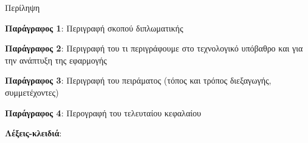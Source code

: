 \pagestyle{plain}
\begin{center}
{\LARGE Περίληψη}\\[1cm]
\end{center}

\setlength{\parindent}{0pt}
\textbf{Παράγραφος 1}: Περιγραφή σκοπού διπλωματικής

\textbf{Παράγραφος 2}: Περιγραφή του τι περιγράφουμε στο τεχνολογικό υπόβαθρο και για
την ανάπτυξη της εφαρμογής

\textbf{Παράγραφος 3}: Περιγραφή του πειράματος (τόπος και τρόπος διεξαγωγής, συμμετέχοντες)

\textbf{Παράγραφος 4}: Περογραφή του τελευταίου κεφαλαίου

\textbf{Λέξεις-κλειδιά}: {\keywords}
